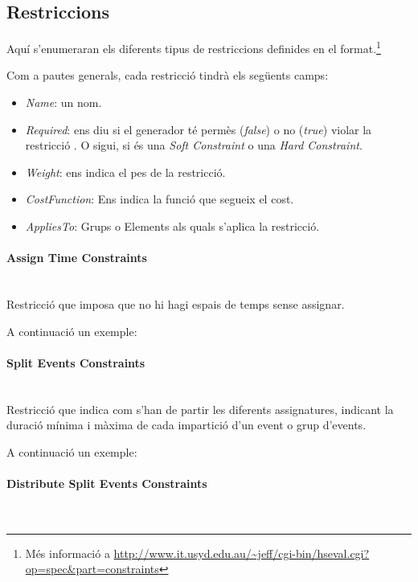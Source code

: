 \documentclass[11pt,a4paper,twoside]{report}
\begin{document}
  \subsection{Restriccions}

  Aquí s'enumeraran els diferents tipus de restriccions definides en el format.\footnote{Més informació a \url{http://www.it.usyd.edu.au/~jeff/cgi-bin/hseval.cgi?op=spec&part=constraints}} 

  Com a pautes generals, cada restricció tindrà els següents camps:
  \begin{itemize}
    \item \textit{Name}: un nom.
    \item \textit{Required}: ens diu si el generador té permès (\textit{false}) o no (\textit{true}) violar la restricció . 
        O sigui, si és una \textit{Soft Constraint} o una \textit{Hard Constraint}.
    \item \textit{Weight}: ens indica el pes de la restricció.
    \item \textit{CostFunction}: Ens indica la funció que segueix el cost.
    \item \textit{AppliesTo}: Grups o Elements als quals s'aplica la restricció.
  \end{itemize}

  \paragraph*{Assign Time Constraints} ~\\

  Restricció que imposa que no hi hagi espais de temps sense assignar.

  A continuació un exemple:

  


  \paragraph*{Split Events Constraints} ~\\
  
  Restricció que indica com s'han de partir les diferents assignatures, indicant la duració mínima i màxima de cada impartició d'un event o grup d'events.

  A continuació un exemple:

  

  \paragraph*{Distribute Split Events Constraints} ~\\
\end{document}
